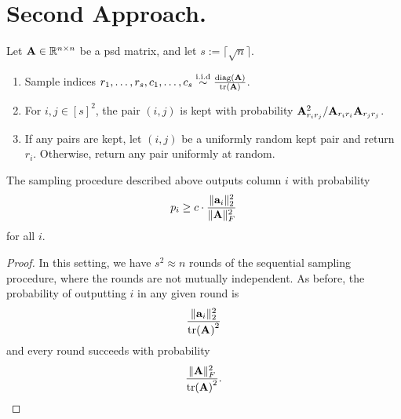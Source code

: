 \documentclass{article}
\begin{document}


% 
% 
\vspace{1em}

\section*{Second Approach.}
Let $\mathbf{A}\in\mathbb{R}^{n\times n}$ be a psd matrix, and let $s:= \lceil\sqrt{n}\rceil$.
\begin{enumerate}
    \item Sample indices $r_1,\ldots, r_s, c_1, \ldots, c_s\stackrel{\text{i.i.d}}{\sim} \frac{\operatorname*{diag}(\mathbf{A})}{\tr(\mathbf{A})}$.
    \item For $i, j\in [s]^2$, the pair $(i, j)$ is kept with probability ${\mathbf{A}_{r_ir_j}^2} / {\mathbf{A}_{r_ir_i}\mathbf{A}_{r_jr_j}}$. 
    \item If any pairs are kept, let $(i,j)$ be a uniformly random kept pair and return $r_i$. Otherwise, return any pair uniformly at random.
\end{enumerate}

\begin{lemma}
The sampling procedure described above outputs column $i$ with probability
\[
p_i\geq c\cdot \frac{\|\mathbf{a}_i\|_2^2}{\|\mathbf{A}\|_F^2}
\]
for all $i$.
\end{lemma}
\begin{proof}
    In this setting, we have $s^2\approx n$ rounds of the sequential sampling procedure, where the rounds are not mutually independent. As before, the probability of outputting $i$ in any given round is 
    \[\frac{\|\mathbf{a}_i\|_2^2}{\tr(\mathbf{A})^2}\]
    and every round succeeds with probability
    \[\frac{\|\mathbf{A}\|_F^2}{\tr(\mathbf{A})^2}.\]
\end{proof}
\end{document}
